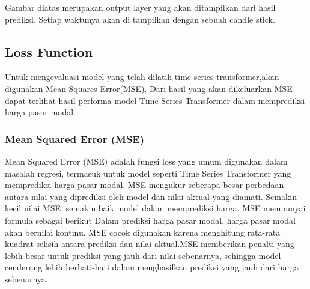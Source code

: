 Gambar diatas merupakan output layer yang akan ditampilkan dari hasil prediksi. Setiap waktunya akan di tampilkan dengan sebuah candle stick.



\subsection{Loss Function}
Untuk mengevaluasi model yang telah dilatih time series transformer,akan digunakan Mean Squares Error(MSE). Dari hasil yang akan dikeluarkan MSE dapat terlihat hasil performa model Time Series Transformer dalam memprediksi harga pasar modal.
\subsubsection{Mean Squared Error (MSE)}
Mean Squared Error (MSE) adalah fungsi loss yang umum digunakan dalam masalah regresi, termasuk untuk model seperti Time Series Transformer yang memprediksi harga pasar modal. MSE mengukur seberapa besar perbedaan antara nilai yang diprediksi oleh model dan nilai aktual yang diamati. Semakin kecil nilai MSE, semakin baik model dalam memprediksi harga. MSE mempunyai formula sebagai berikut
Dalam prediksi harga pasar modal, harga pasar modal akan bernilai kontinu. MSE cocok digunakan karena menghitung rata-rata kuadrat selisih antara prediksi dan nilai aktual.MSE memberikan penalti yang lebih besar untuk prediksi yang jauh dari nilai sebenarnya, sehingga model cenderung lebih berhati-hati dalam menghasilkan prediksi yang jauh dari harga sebenarnya.


